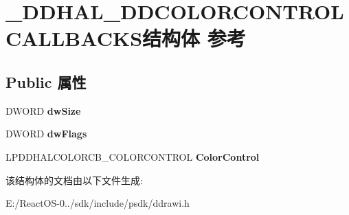 \hypertarget{struct___d_d_h_a_l___d_d_c_o_l_o_r_c_o_n_t_r_o_l_c_a_l_l_b_a_c_k_s}{}\section{\+\_\+\+D\+D\+H\+A\+L\+\_\+\+D\+D\+C\+O\+L\+O\+R\+C\+O\+N\+T\+R\+O\+L\+C\+A\+L\+L\+B\+A\+C\+K\+S结构体 参考}
\label{struct___d_d_h_a_l___d_d_c_o_l_o_r_c_o_n_t_r_o_l_c_a_l_l_b_a_c_k_s}
\subsection*{Public 属性}
\begin{DoxyCompactItemize}
\item 
\mbox{\label{struct___d_d_h_a_l___d_d_c_o_l_o_r_c_o_n_t_r_o_l_c_a_l_l_b_a_c_k_s_a3f9a47a68cf625067e4f3e09e74fc493}} 
D\+W\+O\+RD {\bfseries dw\+Size}
\item 
\mbox{\label{struct___d_d_h_a_l___d_d_c_o_l_o_r_c_o_n_t_r_o_l_c_a_l_l_b_a_c_k_s_af8d759ecec7f2f2a28ea09a4e4ba08ea}} 
D\+W\+O\+RD {\bfseries dw\+Flags}
\item 
\mbox{\label{struct___d_d_h_a_l___d_d_c_o_l_o_r_c_o_n_t_r_o_l_c_a_l_l_b_a_c_k_s_aee22071eb9ead8a1cf3f33619a88a47e}} 
L\+P\+D\+D\+H\+A\+L\+C\+O\+L\+O\+R\+C\+B\+\_\+\+C\+O\+L\+O\+R\+C\+O\+N\+T\+R\+OL {\bfseries Color\+Control}
\end{DoxyCompactItemize}


该结构体的文档由以下文件生成\+:\begin{DoxyCompactItemize}
\item 
E\+:/\+React\+O\+S-\/0../sdk/include/psdk/ddrawi.\+h\end{DoxyCompactItemize}
